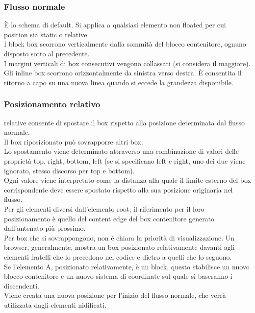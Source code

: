 \documentclass{article}
\begin{document}
\subsubsection{Flusso normale}
È lo schema di default. Si applica a qualsiasi elemento non floated per cui position sia static o relative.\\
I block box scorrono verticalmente dalla sommità del blocco contenitore, ognuno disposto sotto al precedente.\\
I margini verticali di box consecutivi vengono collassati (si considera il maggiore).\\
Gli inline box scorrono orizzontalmente da sinistra verso destra. È consentita il ritorno a capo su una nuova linea quando si eccede la grandezza disponibile.
\subsubsection{Posizionamento relativo}
relative consente di spostare il box rispetto alla posizione determinata dal flusso normale.\\
Il box riposizionato può sovrapporre altri box.\\
Lo spostamento viene determinato attraverso una combinazione di valori delle proprietà top, right, bottom, left (se si specificano left e right, uno dei due viene ignorato, stesso discorso per top e bottom).\\
Ogni valore viene interpretato come la distanza alla quale il limite esterno del box corrispondente deve essere spostato rispetto alla sua posizione originaria nel flusso.\\
Per gli elementi diversi dall'elemento root, il riferimento per il loro posizionamento è quello del content edge del box contenitore generato dall'antenato più prossimo.\\
Per box che si sovrappongono, non è chiara la priorità di visualizzazione. Un browser, generalmente, mostra un box posizionato relativamente davanti agli elementi fratelli che lo precedono nel codice e dietro a quelli che lo seguono.\\
Se l'elemento A, posizionato relativamente, è un block, questo stabilisce un nuovo blocco contenitore e un nuovo sistema di coordinate sul quale si baseranno i discendenti.\\
Viene creata una nuova posizione per l'inizio del flusso normale, che verrà utilizzata dagli elementi nidificati.
\end{document}

